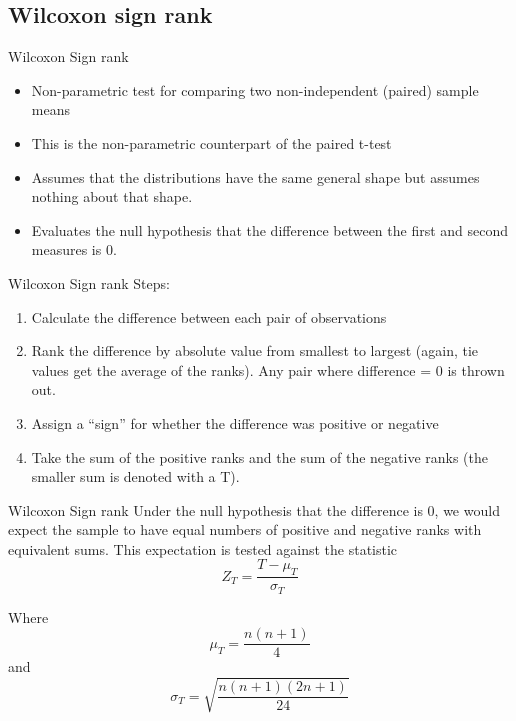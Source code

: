 \documentclass[
  ignorenonframetext,
  aspectratio=169]{beamer}
\providecommand{\tightlist}{%
  \setlength{\itemsep}{0pt}\setlength{\parskip}{0pt}}
\begin{document}
\hypertarget{wilcoxon-sign-rank}{%
\subsection{Wilcoxon sign rank}\label{wilcoxon-sign-rank}}

\begin{frame}{Wilcoxon Sign rank}
\protect\hypertarget{wilcoxon-sign-rank-1}{}
\begin{itemize}
\tightlist
\item
  Non-parametric test for comparing two non-independent (paired) sample
  means
\item
  This is the non-parametric counterpart of the paired t-test
\item
  Assumes that the distributions have the same general shape but assumes
  nothing about that shape.\\
\item
  Evaluates the null hypothesis that the difference between the first
  and second measures is 0.
\end{itemize}
\end{frame}

\begin{frame}{Wilcoxon Sign rank}
\protect\hypertarget{wilcoxon-sign-rank-2}{}
Steps:

\begin{enumerate}
[1)]
\item
  Calculate the difference between each pair of observations
\item
  Rank the difference by absolute value from smallest to largest (again,
  tie values get the average of the ranks). Any pair where difference =
  0 is thrown out.
\item
  Assign a ``sign'' for whether the difference was positive or negative
\item
  Take the sum of the positive ranks and the sum of the negative ranks
  (the smaller sum is denoted with a T).
\end{enumerate}
\end{frame}

\begin{frame}{Wilcoxon Sign rank}
\protect\hypertarget{wilcoxon-sign-rank-3}{}
Under the null hypothesis that the difference is 0, we would expect the
sample to have equal numbers of positive and negative ranks with
equivalent sums. This expectation is tested against the statistic
\[Z_{T}=\frac{T-\mu_{T}}{\sigma_{T}}\]

Where \[\mu_{T}=\frac{n(n+1)}{4}\] and
\[\sigma_{T}=\sqrt{\frac{n(n+1)(2n+1)}{24}}\]
\end{frame}
\end{document}
